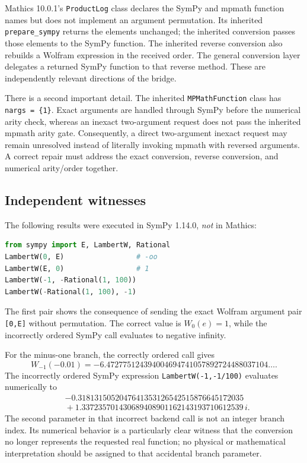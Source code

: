 \documentclass[11pt,a4paper]{article}
\newcommand{\code}[1]{\texttt{#1}}
\begin{document}
Mathics 10.0.1's \code{ProductLog} class declares the SymPy and mpmath function names but does not implement an argument permutation. Its inherited \code{prepare\_sympy} returns the elements unchanged; the inherited conversion passes those elements to the SymPy function. The inherited reverse conversion also rebuilds a Wolfram expression in the received order. The general conversion layer delegates a returned SymPy function to that reverse method. These are independently relevant directions of the bridge.\cite{up-productlog,up-base,up-convert}

There is a second important detail. The inherited \code{MPMathFunction} class has \code{nargs = \{1\}}. Exact arguments are handled through SymPy before the numerical arity check, whereas an inexact two-argument request does not pass the inherited mpmath arity gate. Consequently, a direct two-argument inexact request may remain unresolved instead of literally invoking mpmath with reversed arguments. A correct repair must address the exact conversion, reverse conversion, and numerical arity/order together.\cite{up-base}

\subsection{Independent witnesses}
The following results were executed in SymPy 1.14.0, \emph{not} in Mathics:
\begin{lstlisting}[language=Python]
from sympy import E, LambertW, Rational
LambertW(0, E)                 # -oo
LambertW(E, 0)                 # 1
LambertW(-1, -Rational(1, 100))
LambertW(-Rational(1, 100), -1)
\end{lstlisting}
The first pair shows the consequence of sending the exact Wolfram argument pair \code{[0,E]} without permutation. The correct value is $W_0(e)=1$, while the incorrectly ordered SymPy call evaluates to negative infinity.

For the minus-one branch, the correctly ordered call gives
\begin{equation}
 W_{-1}(-0.01)=-6.472775124394004694741057892724488037104\ldots.
\end{equation}
The incorrectly ordered SymPy expression \code{LambertW(-1,-1/100)} evaluates numerically to
\begin{equation}
\begin{aligned}
 &-0.3181315052047641353126542515876645172035\\
 &{}+1.337235701430689408901162143193710612539\,i.
\end{aligned}
\end{equation}
The second parameter in that incorrect backend call is not an integer branch index. Its numerical behavior is a particularly clear witness that the conversion no longer represents the requested real function; no physical or mathematical interpretation should be assigned to that accidental branch parameter.
\end{document}
